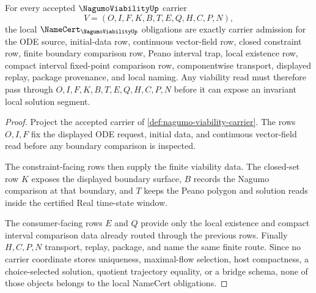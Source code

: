 \begin{theorem}\label{thm:nagumo-viability-obligations}
For every accepted $\NagumoViabilityUp$ carrier
$$
V=(O,I,F,K,B,T,E,Q,H,C,P,N),
$$
the local $\NameCert_{\NagumoViabilityUp}$ obligations are exactly carrier admission for the ODE source, initial-data row, continuous vector-field row, closed constraint row, finite boundary comparison row, Peano interval trap, local existence row, compact interval fixed-point comparison row, componentwise transport, displayed replay, package provenance, and local naming. Any viability read must therefore pass through $O,I,F,K,B,T,E,Q,H,C,P,N$ before it can expose an invariant local solution segment.
\end{theorem}
\begin{proof}
Project the accepted carrier of \autoref{def:nagumo-viability-carrier}. The rows $O,I,F$ fix the displayed ODE request, initial data, and continuous vector-field read before any boundary comparison is inspected.

The constraint-facing rows then supply the finite viability data. The closed-set row $K$ exposes the displayed boundary surface, $B$ records the Nagumo comparison at that boundary, and $T$ keeps the Peano polygon and solution reads inside the certified Real time-state window.

The consumer-facing rows $E$ and $Q$ provide only the local existence and compact interval comparison data already routed through the previous rows. Finally $H,C,P,N$ transport, replay, package, and name the same finite route. Since no carrier coordinate stores uniqueness, maximal-flow selection, host compactness, a choice-selected solution, quotient trajectory equality, or a bridge schema, none of those objects belongs to the local NameCert obligations.
\end{proof}


